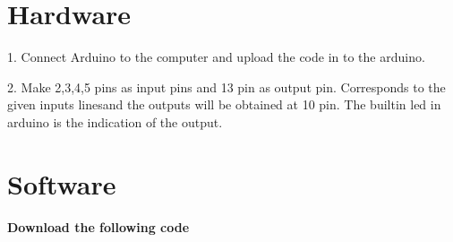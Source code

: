 \documentclass[10pt, a4paper]{article}
\begin{document}
\section{Hardware}
1. Connect Arduino to the computer and upload the code in to the arduino.

2. Make 2,3,4,5 pins as input pins and 13 pin as output pin. Corresponds to the given inputs linesand  the outputs will be obtained at 10 pin. The builtin led in arduino is the indication of the output.
\section{Software}
\textbf{Download the following code}\\
\begin{center}
\end{center}
\end{document}
